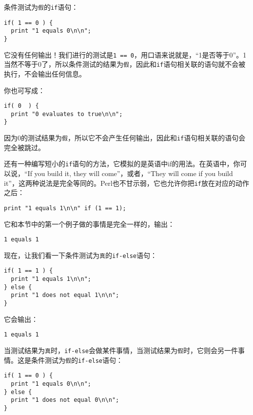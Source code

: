 条件测试为\verb|假|的\verb|if|语句：

\begin{lstlisting}
if( 1 == 0 ) {
  print "1 equals 0\n\n";
}
\end{lstlisting}

它没有任何输出！我们进行的测试是\verb|1 == 0|，用口语来说就是，“1是否等于0”。1当然不等于0了，所以条件测试的结果为\verb|假|，因此和\verb|if|语句相关联的语句就不会被执行，不会输出任何信息。

你也可写成：

\begin{lstlisting}
if( 0  ) {
  print "0 evaluates to true\n\n";
}
\end{lstlisting}

因为0的测试结果为\verb|假|，所以它不会产生任何输出，因此和\verb|if|语句相关联的语句会完全被跳过。

还有一种编写短小的\verb|if|语句的方法，它模拟的是英语中if的用法。在英语中，你可以说，“If you build it, they will come”，或者，“They will come if you build it”，这两种说法是完全等同的。Perl也不甘示弱，它也允许你把\verb|if|放在对应的动作之后：

\begin{lstlisting}
print "1 equals 1\n\n" if (1 == 1);
\end{lstlisting}

它和本节中的第一个例子做的事情是完全一样的，输出：

\begin{lstlisting}
1 equals 1
\end{lstlisting}

现在，让我们看一下条件测试为\verb|真|的\verb|if-else|语句：

\begin{lstlisting}
if( 1 == 1 ) {
  print "1 equals 1\n\n";
} else {
  print "1 does not equal 1\n\n";
}
\end{lstlisting}

它会输出：

\begin{lstlisting}
1 equals 1
\end{lstlisting}

当测试结果为\verb|真|时，\verb|if-else|会做某件事情，当测试结果为\verb|假|时，它则会另一件事情。这是条件测试为\verb|假|的\verb|if-else|语句：

\begin{lstlisting}
if( 1 == 0 ) {
  print "1 equals 0\n\n";
} else {
  print "1 does not equal 0\n\n";
}
\end{lstlisting}

